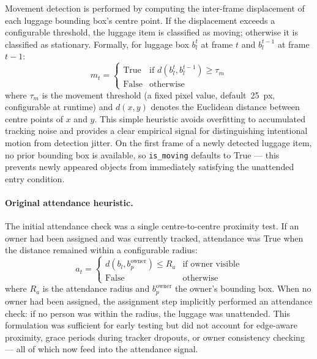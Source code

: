 Movement detection is performed by computing the inter-frame displacement of
each luggage bounding box's centre point. If the displacement exceeds a
configurable threshold, the luggage item is classified as moving; otherwise it
is classified as stationary. Formally, for luggage box $b_l^{t}$ at frame $t$
and $b_l^{t-1}$ at frame $t-1$:
\begin{equation}
	m_t = \begin{cases}
		\text{True}  & \text{if } d(b_l^{t}, b_l^{t-1}) \ge \tau_m \\
		\text{False} & \text{otherwise}
	\end{cases}
\end{equation}
where $\tau_m$ is the movement threshold (a fixed pixel value, default~25~px,
configurable at runtime) and $d(x, y)$ denotes the Euclidean distance between
centre points of $x$ and $y$. This simple heuristic avoids overfitting to
accumulated tracking noise and provides a clear empirical signal for
distinguishing intentional motion from detection jitter. On the first frame of
a newly detected luggage item, no prior bounding box is available, so
\texttt{is\_moving} defaults to True --- this prevents newly appeared objects
from immediately satisfying the unattended entry condition.

\paragraph{Original attendance heuristic.}

The initial attendance check was a single centre-to-centre proximity test. If
an owner had been assigned and was currently tracked, attendance was True when
the distance remained within a configurable radius:
\begin{equation}
	a_t = \begin{cases}
		d(b_l, b_p^{\text{owner}}) \le R_a
		 & \text{if owner visible} \\[1ex]
		\text{False}
		 & \text{otherwise}
	\end{cases}
\end{equation}
where $R_a$ is the attendance radius and $b_p^{\text{owner}}$ the owner's
bounding box. When no owner had been assigned, the assignment step implicitly
performed an attendance check: if no person was within the radius, the luggage
was unattended. This formulation was sufficient for early testing but did not
account for edge-aware proximity, grace periods during tracker dropouts, or
owner consistency checking --- all of which now feed into the attendance signal.

